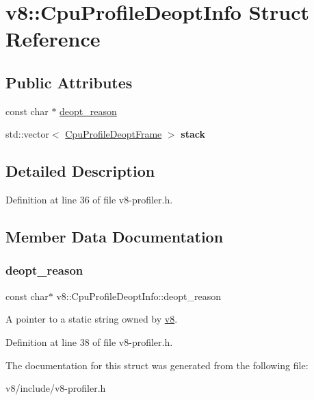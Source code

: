 \hypertarget{structv8_1_1CpuProfileDeoptInfo}{}\section{v8\+:\+:Cpu\+Profile\+Deopt\+Info Struct Reference}
\label{structv8_1_1CpuProfileDeoptInfo}
\subsection*{Public Attributes}
\begin{DoxyCompactItemize}
\item 
const char $\ast$ \mbox{\hyperlink{structv8_1_1CpuProfileDeoptInfo_a908eb3ba33b47ace8973eeb2fda96ca9}{deopt\+\_\+reason}}
\item 
\mbox{\label{structv8_1_1CpuProfileDeoptInfo_a9446493c0e0a00e3ada02ba8df858d42}} 
std\+::vector$<$ \mbox{\hyperlink{structv8_1_1CpuProfileDeoptFrame}{Cpu\+Profile\+Deopt\+Frame}} $>$ {\bfseries stack}
\end{DoxyCompactItemize}


\subsection{Detailed Description}


Definition at line 36 of file v8-\/profiler.\+h.



\subsection{Member Data Documentation}
\mbox{\label{structv8_1_1CpuProfileDeoptInfo_a908eb3ba33b47ace8973eeb2fda96ca9}} 
\subsubsection{\texorpdfstring{deopt\+\_\+reason}{deopt\_reason}}
{\footnotesize\ttfamily const char$\ast$ v8\+::\+Cpu\+Profile\+Deopt\+Info\+::deopt\+\_\+reason}

A pointer to a static string owned by \mbox{\hyperlink{namespacev8}{v8}}. 

Definition at line 38 of file v8-\/profiler.\+h.



The documentation for this struct was generated from the following file\+:\begin{DoxyCompactItemize}
\item 
v8/include/v8-\/profiler.\+h\end{DoxyCompactItemize}
